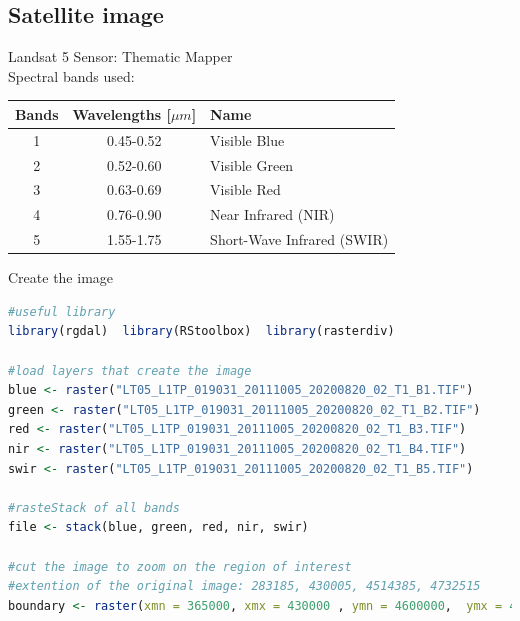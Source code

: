 \documentclass[10pt]{beamer}
\begin{document}
\subsection{Satellite image}

\begin{frame}{Landsat 5}
Sensor: Thematic Mapper \\
Spectral bands used:
\begin{table}[h]
    \begin{tabular}{c|c|l}
    \toprule
    \midrule
  Bands & Wavelengths [$\mu m$] & Name \\
    \midrule
    1  & 0.45-0.52 &  Visible Blue\\
    2 & 0.52-0.60 & Visible Green\\ 
    3 & 0.63-0.69 & Visible Red\\
    4 & 0.76-0.90 & Near Infrared (NIR)\\
    5 & 1.55-1.75 & Short-Wave Infrared (SWIR) \\
    \midrule
    \bottomrule
\end{tabular}
\end{table}
\end{frame}

\begin{frame}[fragile]{Create the image}
\begin{lstlisting}[language = R]
#useful library
library(rgdal)  library(RStoolbox)  library(rasterdiv)

#load layers that create the image
blue <- raster("LT05_L1TP_019031_20111005_20200820_02_T1_B1.TIF") 
green <- raster("LT05_L1TP_019031_20111005_20200820_02_T1_B2.TIF") 
red <- raster("LT05_L1TP_019031_20111005_20200820_02_T1_B3.TIF") 
nir <- raster("LT05_L1TP_019031_20111005_20200820_02_T1_B4.TIF") 
swir <- raster("LT05_L1TP_019031_20111005_20200820_02_T1_B5.TIF") 

#rasteStack of all bands
file <- stack(blue, green, red, nir, swir)

#cut the image to zoom on the region of interest
#extention of the original image: 283185, 430005, 4514385, 4732515  
boundary <- raster(xmn = 365000, xmx = 430000 , ymn = 4600000,  ymx = 4680000)
\end{lstlisting}
\end{frame}
\end{document}
